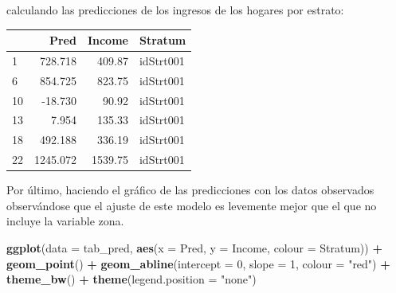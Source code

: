 \documentclass[
  spanish,
  12pt,
]{book}
\newenvironment{Shaded}{\begin{snugshade}}{\end{snugshade}}
\newcommand{\AttributeTok}[1]{\textcolor[rgb]{0.13,0.29,0.53}{#1}}
\newcommand{\DataTypeTok}[1]{\textcolor[rgb]{0.13,0.29,0.53}{#1}}
\newcommand{\DecValTok}[1]{\textcolor[rgb]{0.00,0.00,0.81}{#1}}
\newcommand{\FunctionTok}[1]{\textcolor[rgb]{0.13,0.29,0.53}{\textbf{#1}}}
\newcommand{\NormalTok}[1]{#1}
\newcommand{\OtherTok}[1]{\textcolor[rgb]{0.56,0.35,0.01}{#1}}
\newcommand{\SpecialCharTok}[1]{\textcolor[rgb]{0.81,0.36,0.00}{\textbf{#1}}}
\newcommand{\StringTok}[1]{\textcolor[rgb]{0.31,0.60,0.02}{#1}}
\begin{document}
calculando las predicciones de los ingresos de los hogares por estrato:

\begin{Shaded}
\end{Shaded}

\begin{tabular}{l|r|r|l}
\hline
  & Pred & Income & Stratum\\
\hline
1 & 728.718 & 409.87 & idStrt001\\
\hline
6 & 854.725 & 823.75 & idStrt001\\
\hline
10 & -18.730 & 90.92 & idStrt001\\
\hline
13 & 7.954 & 135.33 & idStrt001\\
\hline
18 & 492.188 & 336.19 & idStrt001\\
\hline
22 & 1245.072 & 1539.75 & idStrt001\\
\hline
\end{tabular}

Por último, haciendo el gráfico de las predicciones con los datos observados observándose que el ajuste de este modelo es levemente mejor que el que no incluye la variable zona.

\begin{Shaded}
\begin{Highlighting}[]
\FunctionTok{ggplot}\NormalTok{(}\AttributeTok{data =}\NormalTok{ tab\_pred, }\FunctionTok{aes}\NormalTok{(}\AttributeTok{x =}\NormalTok{ Pred, }\AttributeTok{y =}\NormalTok{ Income, }\AttributeTok{colour =}\NormalTok{ Stratum)) }\SpecialCharTok{+} 
  \FunctionTok{geom\_point}\NormalTok{() }\SpecialCharTok{+} \FunctionTok{geom\_abline}\NormalTok{(}\AttributeTok{intercept =} \DecValTok{0}\NormalTok{, }\AttributeTok{slope =} \DecValTok{1}\NormalTok{, }\AttributeTok{colour =} \StringTok{"red"}\NormalTok{) }\SpecialCharTok{+}
  \FunctionTok{theme\_bw}\NormalTok{() }\SpecialCharTok{+} \FunctionTok{theme}\NormalTok{(}\AttributeTok{legend.position =} \StringTok{"none"}\NormalTok{) }
\end{Highlighting}
\end{Shaded}
\end{document}

